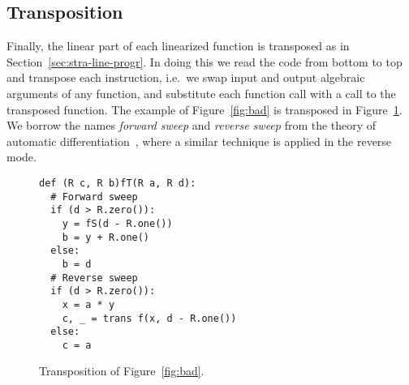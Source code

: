 \ifbfive\enlargethispage{\baselineskip}\fi
\subsection{Transposition}
\label{sec:transposition}
Finally, the linear part of each linearized function is transposed as
in Section~\ref{sec:stra-line-progr}. In doing this we read the code
from bottom to top and transpose each instruction, i.e.\ we swap input
and output algebraic arguments of any function, and substitute each
function call with a call to the transposed function. The example of
Figure~\ref{fig:bad} is transposed in Figure~\ref{fig:mechant}. We
borrow the names \emph{forward sweep} and
\emph{reverse sweep} from the theory of automatic
differentiation~\cite{griewank2008evaluating}, where a similar
technique is applied in the reverse mode.

\begin{figure}[t]
  \centering
\begin{lstlisting}
def (R c, R b)fT(R a, R d):
  # Forward sweep
  if (d > R.zero()):
    y = fS(d - R.one())
    b = y + R.one()
  else:
    b = d
  # Reverse sweep
  if (d > R.zero()):
    x = a * y
    c, _ = trans f(x, d - R.one())
  else:
    c = a
\end{lstlisting}
  \caption{Transposition of Figure~\ref{fig:bad}.}
  \label{fig:mechant}
\end{figure}




